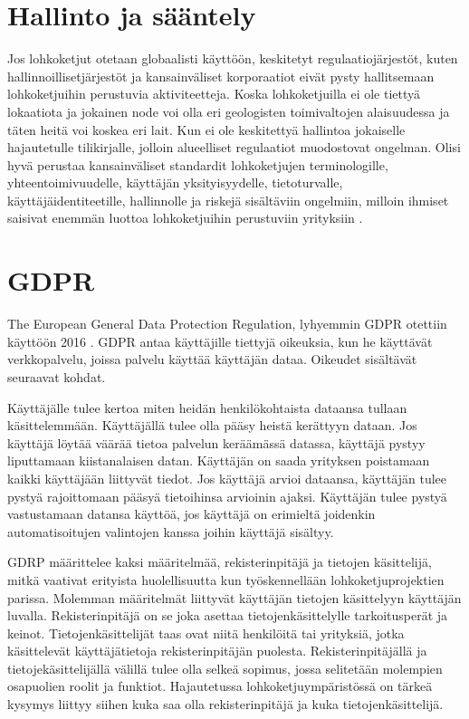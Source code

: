 \documentclass[utf8,bachelor]{gradu3}
\begin{document}
\section{Hallinto ja sääntely}
Jos lohkoketjut otetaan globaalisti käyttöön, keskitetyt regulaatiojärjestöt, kuten hallinnoillisetjärjestöt ja kansainväliset korporaatiot eivät pysty hallitsemaan lohkoketjuihin perustuvia aktiviteetteja. \parencite{wright2015decentralized}
Koska lohkoketjuilla ei ole tiettyä lokaatiota ja jokainen node voi olla eri geologisten toimivaltojen alaisuudessa ja täten heitä voi koskea eri lait. 
Kun ei ole keskitettyä hallintoa jokaiselle hajautetulle tilikirjalle, jolloin alueelliset regulaatiot muodostovat ongelman. \parencite{cermeno2016blockchain}
Olisi hyvä perustaa kansainväliset standardit lohkoketjujen terminologille, yhteentoimivuudelle, käyttäjän yksityisyydelle, tietoturvalle, käyttäjäidentiteetille, hallinnolle ja riskejä sisältäviin ongelmiin, milloin ihmiset saisivat enemmän luottoa lohkoketjuihin perustuviin yrityksiin \parencite{ali2019blockchain}.

\section{GDPR}

The European General Data Protection Regulation, lyhyemmin GDPR otettiin käyttöön 2016 \parencite{GDPR}.
GDPR antaa käyttäjille tiettyjä oikeuksia, kun he käyttävät verkkopalvelu, joissa palvelu käyttää käyttäjän dataa. Oikeudet sisältävät seuraavat kohdat.

Käyttäjälle tulee kertoa miten heidän henkilökohtaista dataansa tullaan käsittelemmään.
Käyttäjällä tulee olla pääsy heistä kerättyyn dataan.
Jos käyttäjä löytää väärää tietoa palvelun keräämässä datassa, käyttäjä pystyy liputtamaan kiistanalaisen datan.
Käyttäjän on saada yrityksen poistamaan kaikki käyttäjään liittyvät tiedot.
Jos käyttäjä arvioi dataansa, käyttäjän tulee pystyä rajoittomaan pääsyä tietoihinsa  arvioinin ajaksi.
Käyttäjän tulee pystyä vastustamaan datansa käyttöä, jos käyttäjä on erimieltä joidenkin automatisoitujen valintojen kanssa joihin käyttäjä sisältyy.

GDRP määrittelee kaksi määritelmää, rekisterinpitäjä ja tietojen käsittelijä, mitkä vaativat erityista huolellisuutta kun työskennellään lohkoketjuprojektien parissa. Molemman määritelmät liittyvät käyttäjän tietojen käsittelyyn käyttäjän luvalla.
Rekisterinpitäjä on se joka asettaa tietojenkäsittelylle tarkoitusperät ja keinot. Tietojenkäsittelijät taas ovat niitä henkilöitä tai yrityksiä, jotka käsittelevät käyttäjätietoja rekisterinpitäjän puolesta. Rekisterinpitäjällä ja tietojekäsittelijällä välillä tulee olla selkeä sopimus, jossa selitetään molempien osapuolien roolit ja funktiot.
Hajautetussa lohkoketjuympäristössä on tärkeä kysymys liittyy siihen kuka saa olla rekisterinpitäjä ja kuka tietojenkäsittelijä.
\end{document}
